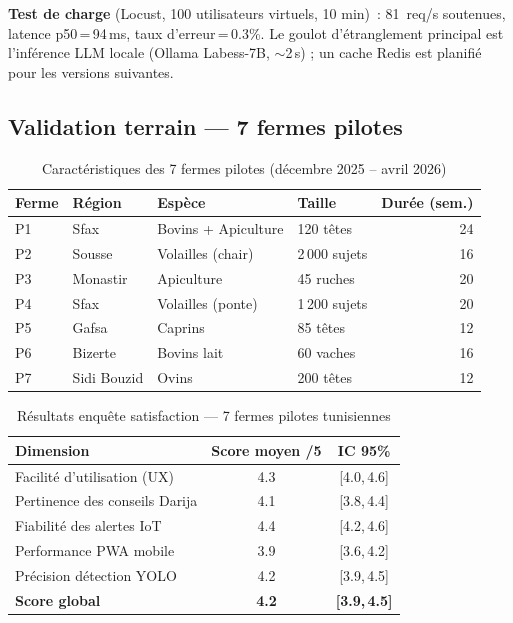 \noindent\textbf{Test de charge} (Locust, 100 utilisateurs virtuels, 10 min)~:
81~req/s soutenues, latence p50\,=\,94\,ms, taux d'erreur\,=\,0.3\%.
Le goulot d'étranglement principal est l'inférence LLM locale
(Ollama Labess-7B, $\sim$2\,s) ; un cache Redis est planifié pour les versions suivantes.

\subsection{Validation terrain --- 7 fermes pilotes}

\begin{table}[H]
\centering
\caption[Fermes pilotes]{Caractéristiques des 7 fermes pilotes (décembre 2025 -- avril 2026)}
\label{tab:fermes_pilotes}
\small
\renewcommand{\arraystretch}{1.2}
\begin{tabular}{@{}llllr@{}}
\toprule
\textbf{Ferme} & \textbf{Région} & \textbf{Espèce} & \textbf{Taille} & \textbf{Durée (sem.)} \\
\midrule
P1 & Sfax        & Bovins + Apiculture   & 120 têtes      & 24 \\
P2 & Sousse      & Volailles (chair)     & 2\,000 sujets  & 16 \\
P3 & Monastir    & Apiculture            & 45 ruches      & 20 \\
P4 & Sfax        & Volailles (ponte)     & 1\,200 sujets  & 20 \\
P5 & Gafsa       & Caprins               & 85 têtes       & 12 \\
P6 & Bizerte     & Bovins lait           & 60 vaches      & 16 \\
P7 & Sidi Bouzid & Ovins                 & 200 têtes      & 12 \\
\bottomrule
\end{tabular}
\end{table}

\begin{table}[H]
\centering
\caption[Enquête satisfaction]{Résultats enquête satisfaction --- 7 fermes pilotes tunisiennes}
\label{tab:satisfaction}
\small
\renewcommand{\arraystretch}{1.25}
\begin{tabular}{@{}lcc@{}}
\toprule
\textbf{Dimension} & \textbf{Score moyen /5} & \textbf{IC 95\%} \\
\midrule
Facilité d'utilisation (UX)    & 4.3 & [4.0,\,4.6] \\
Pertinence des conseils Darija & 4.1 & [3.8,\,4.4] \\
Fiabilité des alertes IoT      & 4.4 & [4.2,\,4.6] \\
Performance PWA mobile         & 3.9 & [3.6,\,4.2] \\
Précision détection YOLO       & 4.2 & [3.9,\,4.5] \\
\midrule
\textbf{Score global}          & \textbf{4.2} & \textbf{[3.9,\,4.5]} \\
\bottomrule
\end{tabular}
\end{table}

